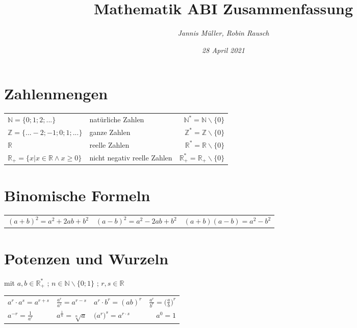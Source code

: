 \documentclass[a4paper, 15pt]{article}
\title{Mathematik ABI Zusammenfassung}
\date{\slshape 28 April 2021}
\author{\slshape Jannis Müller, Robin Rausch}
\begin{document}
\maketitle
\tableofcontents
\newpage
\section{Zahlenmengen}
\begin{table} [h]
\begin{tabularx}{\textwidth}{ X X r }
  $\mathbb{N} = \{0; 1; 2; ...\}$ & natürliche Zahlen & $\mathbb{N}^* = \mathbb{N}\backslash\{0\}$\\[0.2cm] 
  $\mathbb{Z} = \{... -2; -1; 0; 1; ...\}$ & ganze Zahlen & $\mathbb{Z}^* = \mathbb{Z}\backslash\{0\}$\\[0.2cm]  
  $\mathbb{R}$ & reelle Zahlen & $\mathbb{R}^* = \mathbb{R}\backslash\{0\}$\\[0.2cm]  
  $\mathbb{R}_+ = \{x|x \in \mathbb{R} \land x \geq0 \}$ & nicht negativ reelle Zahlen & $\mathbb{R}^*_+ = \mathbb{R}_+\backslash\{0\}$\\
\end{tabularx}
\end{table}
\section{Binomische Formeln}
\begin{table} [h]
\begin{tabularx}{\textwidth}{ X X r }
  $(a+b)^2 = a^2+2ab+b^2$ & $(a-b)^2 = a^2-2ab+b^2$ & $(a+b)(a-b) = a^2 - b^2$
\end{tabularx}
\end{table}
\section{Potenzen und Wurzeln}
mit $a,b \in \mathbb{R}^*_+$ ; $n \in \mathbb{N} \backslash \{0;1\}$ ; $r,s \in \mathbb{R}$
\begin{table} [h]
\Large
\begin{tabularx}{\textwidth}{ X X X r }
$a^r \cdot a^s = a^{r+s}$ & $\frac{a^r}{a^s} = a^{r-s}$ & $a^r \cdot b^r = (ab)^r$ & $\frac{a^r}{b^r} =\Big(\frac{a}{b}\Big)^r$\\ [0.4cm] 
$a^{-r} = \frac{1}{a^r}$ & $a^{\frac{1}{n}} = \sqrt[n]{a}$ & $\big(a^r\big)^s = a^{r \cdot s}$ & $a^0 = 1$
\end{tabularx}
\end{table}
\end{document}
